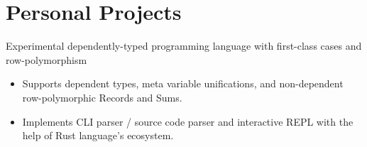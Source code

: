 \documentclass{resume}
\begin{document}
\section{Personal Projects}


Experimental dependently-typed programming language with first-class cases and row-polymorphism
\begin{itemize}
  \item Supports dependent types, meta variable unifications, and non-dependent row-polymorphic Records and Sums.
  \item Implements CLI parser / source code parser and interactive REPL with the help of Rust language's ecosystem.
\end{itemize}

\end{document}
